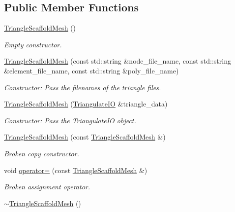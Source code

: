 \subsection*{Public Member Functions}
\begin{DoxyCompactItemize}
\item 
\hyperlink{classoomph_1_1TriangleScaffoldMesh_a804e5432620818f020ff4c8148da32a0}{Triangle\+Scaffold\+Mesh} ()
\begin{DoxyCompactList}\small\item\em Empty constructor. \end{DoxyCompactList}\item 
\hyperlink{classoomph_1_1TriangleScaffoldMesh_a78a4ea139165dfd742f89fc362f5fc13}{Triangle\+Scaffold\+Mesh} (const std\+::string \&node\+\_\+file\+\_\+name, const std\+::string \&element\+\_\+file\+\_\+name, const std\+::string \&poly\+\_\+file\+\_\+name)
\begin{DoxyCompactList}\small\item\em Constructor\+: Pass the filenames of the triangle files. \end{DoxyCompactList}\item 
\hyperlink{classoomph_1_1TriangleScaffoldMesh_a228c2b0bf8ae759cc5bd0e22220db044}{Triangle\+Scaffold\+Mesh} (\hyperlink{structoomph_1_1TriangulateIO}{Triangulate\+IO} \&triangle\+\_\+data)
\begin{DoxyCompactList}\small\item\em Constructor\+: Pass the \hyperlink{structoomph_1_1TriangulateIO}{Triangulate\+IO} object. \end{DoxyCompactList}\item 
\hyperlink{classoomph_1_1TriangleScaffoldMesh_a74c8487ad1f0bf76cea7b34f1f8af0cd}{Triangle\+Scaffold\+Mesh} (const \hyperlink{classoomph_1_1TriangleScaffoldMesh}{Triangle\+Scaffold\+Mesh} \&)
\begin{DoxyCompactList}\small\item\em Broken copy constructor. \end{DoxyCompactList}\item 
void \hyperlink{classoomph_1_1TriangleScaffoldMesh_aedb8d1ce9b5e7d39687013ac3cf2afef}{operator=} (const \hyperlink{classoomph_1_1TriangleScaffoldMesh}{Triangle\+Scaffold\+Mesh} \&)
\begin{DoxyCompactList}\small\item\em Broken assignment operator. \end{DoxyCompactList}\item 
\hyperlink{classoomph_1_1TriangleScaffoldMesh_ac53d43d072f72576c1e1d15c5eddb806}{$\sim$\+Triangle\+Scaffold\+Mesh} ()

\end{DoxyCompactItemize}
